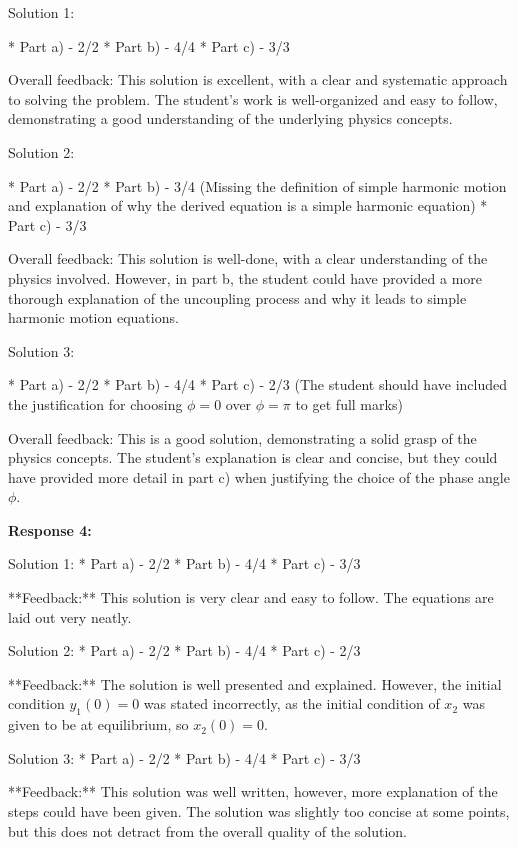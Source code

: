 \documentclass[a4paper,11pt]{article}
\begin{document}
Solution 1:

*   Part a) - 2/2
*   Part b) - 4/4
*   Part c) - 3/3

Overall feedback: This solution is excellent, with a clear and systematic approach to solving the problem. The student's work is well-organized and easy to follow, demonstrating a good understanding of the underlying physics concepts.

Solution 2:

*   Part a) - 2/2
*   Part b) - 3/4 (Missing the definition of simple harmonic motion and explanation of why the derived equation is a simple harmonic equation)
*   Part c) - 3/3

Overall feedback: This solution is well-done, with a clear understanding of the physics involved. However, in part b, the student could have provided a more thorough explanation of the uncoupling process and why it leads to simple harmonic motion equations.

Solution 3:

*   Part a) - 2/2
*   Part b) - 4/4
*   Part c) - 2/3 (The student should have included the justification for choosing \( \phi = 0 \) over \( \phi = \pi \) to get full marks)

Overall feedback: This is a good solution, demonstrating a solid grasp of the physics concepts. The student's explanation is clear and concise, but they could have provided more detail in part c) when justifying the choice of the phase angle \( \phi \).

\bigskip    
\textbf{Response 4:}

Solution 1:
*   Part a) - 2/2
*   Part b) - 4/4
*   Part c) - 3/3

**Feedback:** This solution is very clear and easy to follow. The equations are laid out very neatly.


Solution 2:
*   Part a) - 2/2
*   Part b) - 4/4
*   Part c) - 2/3

**Feedback:** The solution is well presented and explained. However, the initial condition \( y_{1}(0) = 0 \) was stated incorrectly, as the initial condition of \( x_{2} \) was given to be at equilibrium, so \( x_{2}(0) = 0 \).


Solution 3:
*   Part a) - 2/2
*   Part b) - 4/4
*   Part c) - 3/3

**Feedback:** This solution was well written, however, more explanation of the steps could have been given. The solution was slightly too concise at some points, but this does not detract from the overall quality of the solution.
\end{document}
